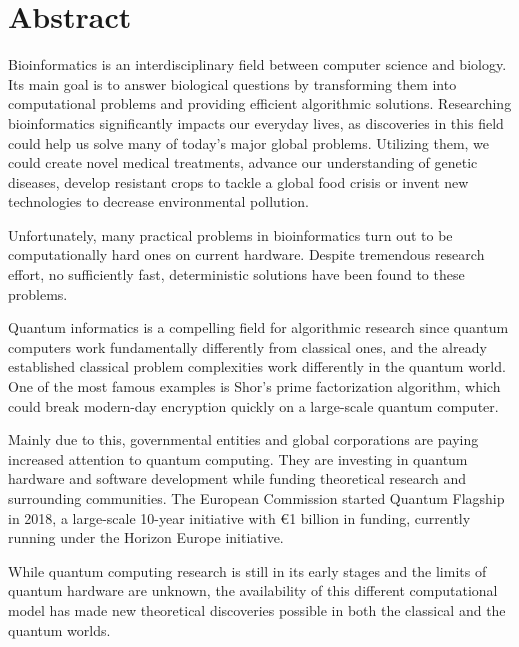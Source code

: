 \vfill
\selectenglish


\chapter*{Abstract}

Bioinformatics is an interdisciplinary field between computer science and biology. Its main goal is to answer biological questions by transforming them into computational problems and providing efficient algorithmic solutions. Researching bioinformatics significantly impacts our everyday lives, as discoveries in this field could help us solve many of today's major global problems. Utilizing them, we could create novel medical treatments, advance our understanding of genetic diseases, develop resistant crops to tackle a global food crisis or invent new technologies to decrease environmental pollution.

Unfortunately, many practical problems in bioinformatics turn out to be computationally hard ones on current hardware. Despite tremendous research effort, no sufficiently fast, deterministic solutions have been found to these problems.

Quantum informatics is a compelling field for algorithmic research since quantum computers work fundamentally differently from classical ones, and the already established classical problem complexities work differently in the quantum world. One of the most famous examples is Shor's prime factorization algorithm, which could break modern-day encryption quickly on a large-scale quantum computer.

Mainly due to this, governmental entities and global corporations are paying increased attention to quantum computing. They are investing in quantum hardware and software development while funding theoretical research and surrounding communities. The European Commission started Quantum Flagship in 2018, a large-scale 10-year initiative with €1 billion in funding, currently running under the Horizon Europe initiative.

While quantum computing research is still in its early stages and the limits of quantum hardware are unknown, the availability of this different computational model has made new theoretical discoveries possible in both the classical and the quantum worlds.

